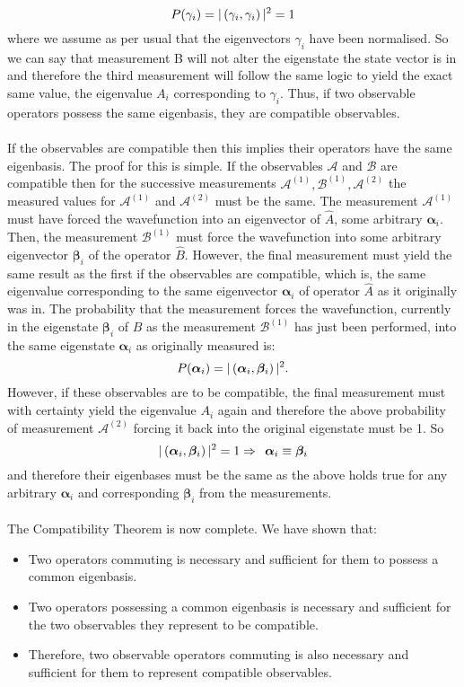 $$
P(\gamma_{i})=|\left(\gamma_{i},\gamma_{i}\right)|^2=1
$$
where we assume as per usual that the eigenvectors $\gamma_{i}$ have been normalised. So we can say that measurement B will not alter the eigenstate the state vector is in and therefore the third measurement will follow the same logic to yield the exact same value, the eigenvalue $A_{i}$ corresponding to $\gamma_{i}$. Thus, if two observable operators possess the same eigenbasis, they are compatible observables.
\\\\
If the observables are compatible then this implies their operators have the same eigenbasis. The proof for this is simple. If the observables $\mathcal{A}$ and $\mathcal{B}$ are compatible then for the successive measurements $\mathcal{A}^{(1)},\mathcal{B}^{(1)},\mathcal{A}^{(2)}$ the measured values for $\mathcal{A}^{(1)}$ and $\mathcal{A}^{(2)}$ must be the same. The measurement $\mathcal{A}^{(1)}$ must have forced the wavefunction into an eigenvector of $\hat{A}$, some arbitrary $\bm{\alpha}_{i}$. Then, the measurement $\mathcal{B}^{(1)}$ must force the wavefunction into some arbitrary eigenvector $\bm{\beta}_{i}$ of the operator $\hat{B}$. However, the final measurement must yield the same result as the first if the observables are compatible, which is, the same eigenvalue corresponding to the same eigenvector $\bm{\alpha}_{i}$ of operator $\hat{A}$ as it originally was in. The probability that the measurement forces the wavefunction, currently in the eigenstate $\bm{\beta}_{i}$ of $\hat{B}$ as the measurement $\mathcal{B}^{(1)}$ has just been performed, into the same eigenstate $\bm{\alpha}_{i}$ as originally measured is:
$$
P(\bm{\alpha}_{i})=|\left(\bm{\alpha}_{i},\bm{\beta}_{i}\right)|^2.
$$
However, if these observables are to be compatible, the final measurement must with certainty yield the eigenvalue $A_{i}$ again and therefore the above probability of measurement $\mathcal{A}^{(2)}$ forcing it back into the original eigenstate must be 1. So 
$$
|\left(\bm{\alpha}_{i},\bm{\beta}_{i}\right)|^2=1 \Rightarrow\:\: \bm{\alpha}_{i}\equiv\bm{\beta}_{i}
$$
and therefore their eigenbases must be the same as the above holds true for any arbitrary $\bm{\alpha}_{i}$ and corresponding $\bm{\beta}_{i}$ from the measurements.
\\\\
The Compatibility Theorem is now complete. We have shown that:
\begin{itemize}
    \item Two operators commuting is necessary and sufficient for them to possess a common eigenbasis.
    \item Two operators possessing a common eigenbasis is necessary and sufficient for the two observables they represent to be compatible.
    \item Therefore, two observable operators commuting is also necessary and sufficient for them to represent compatible observables.
\end{itemize}

